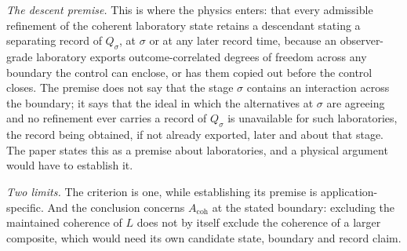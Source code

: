 \emph{The descent premise.} This is where the physics enters: that every admissible refinement of the coherent laboratory state retains a descendant stating a separating record of $Q_\sigma$, at $\sigma$ or at any later record time, because an observer-grade laboratory exports outcome-correlated degrees of freedom across any boundary the control can enclose, or has them copied out before the control closes. The premise does not say that the stage $\sigma$ contains an interaction across the boundary; it says that the ideal in which the alternatives at $\sigma$ are agreeing and no refinement ever carries a record of $Q_\sigma$ is unavailable for such laboratories, the record being obtained, if not already exported, later and about that stage. The paper states this as a premise about laboratories, and a physical argument would have to establish it.

\emph{Two limits.} The criterion is one, while establishing its premise is application-specific. And the conclusion concerns $A_{\mathrm{coh}}$ at the stated boundary: excluding the maintained coherence of $L$ does not by itself exclude the coherence of a larger composite, which would need its own candidate state, boundary and record claim.

